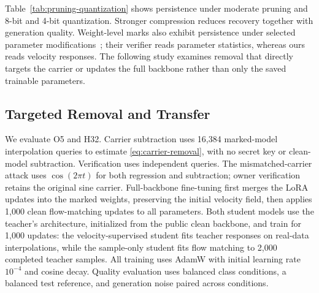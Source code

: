 \documentclass[11pt]{article}
\begin{document}
Table~\ref{tab:pruning-quantization} shows persistence under moderate
pruning and 8-bit and 4-bit quantization. Stronger compression reduces
recovery together with generation quality. Weight-level marks also
exhibit persistence under selected parameter
modifications~\cite{uchida2017embedding}; their verifier reads parameter
statistics, whereas ours reads velocity responses. The following study
examines removal that directly targets the carrier or updates the full
backbone rather than only the saved trainable parameters.

\FloatBarrier
\subsection{Targeted Removal and Transfer}\label{sec:removal-transfer}

We evaluate O5 and H32. Carrier subtraction uses 16,384 marked-model interpolation
queries to estimate \eqref{eq:carrier-removal}, with no secret key or
clean-model subtraction. Verification uses independent queries.
The mismatched-carrier attack uses $\cos(2\pi t)$ for both regression
and subtraction; owner verification retains the original sine carrier.
Full-backbone fine-tuning first merges the LoRA updates into the marked
weights, preserving the initial velocity field, then applies 1,000
clean flow-matching updates to all parameters. Both student models use
the teacher's architecture, initialized from the public clean backbone,
and train for 1,000 updates:
the velocity-supervised student fits teacher responses on real-data
interpolations, while the sample-only student fits flow matching to
2,000 completed teacher samples. All training uses AdamW with initial
learning rate $10^{-4}$ and cosine decay.
Quality evaluation uses balanced class conditions, a balanced test
reference, and generation noise paired across conditions.
\end{document}
